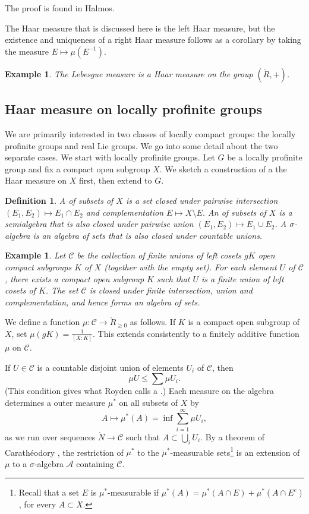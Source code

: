 \documentclass{amsart}
\newtheorem{definition}[equation]{Definition}
\newtheorem{example}[exercise]{Example}
\def\cC{{\mathcal C}}
\begin{document}
The proof is found in Halmos.

The Haar measure that is discussed here is the left Haar measure, but
the existence and uniqueness of a right Haar measure follows as a
corollary by taking the measure $E\mapsto \mu(E^{-1})$.

\begin{example} The Lebesgue measure is a Haar measure on the group
  $(\ring{R},+)$.
\end{example}

\newpage

\subsection{Haar measure on locally profinite groups}

We are primarily interested in two classes of locally compact groups:
the locally profinite groups and real Lie groups.  We go into some
detail about the two separate cases.  We start with locally profinite
groups.  Let $G$ be a locally profinite group and fix a compact open
subgroup $X$.  We sketch a construction of a 
the Haar measure on $X$ first, then extend
to $G$.

\begin{definition}
  A  of subsets of $X$ is a set closed under
  pairwise intersection $(E_1,E_2)\mapsto E_1\cap E_2$ and
  complementation $E\mapsto X\setminus E$.  An  of
  subsets of $X$ is a semialgebra that is also closed under pairwise
  union $(E_1,E_2)\mapsto E_1\cup E_2$.  A {\it $\sigma$-algebra} is
  an algebra of sets that is also closed under countable unions.
\end{definition}

\begin{example} Let $\cC$ be the collection of finite unions of
  left cosets $gK$ open compact subgroups $K$ of $X$ (together with
  the empty set).  For each element $U$ of $\cC$, there exists a
  compact open subgroup $K$ such that $U$ is a finite union of left
  cosets of $K$.  The set $\cC$ is closed under finite
  intersection, union and complementation, and hence forms an algebra
  of sets.
\end{example}

We define a function $\mu:\cC \to \ring{R}_{\ge0}$ as follows.
If $K$ is a compact open subgroup of $X$,
set $\mu(g K) = \frac{1}{[X:K]}$.  This extends consistently to a
finitely additive function $\mu$ on $\cC$.

If $U\in \cC$ is a countable disjoint union of elements $U_i$ of
$\cC$, then
\[
\mu U \le \sum \mu U_i.
\]
(This condition gives what Royden \cite[p 260]{royden} 
calls a .)  Each measure on the algebra determines
a outer measure $\mu^*$ on all subsets of $X$ by
\[
A \mapsto \mu^*(A) = \inf \sum_{i=1}^\infty \mu U_i,
\]
as we run over sequences $\ring{N}\to \cC$ such that $A\subset
\bigcup_i U_i$.  By a theorem of Carath\'eodory \cite[p 257]{royden},
the restriction of $\mu^*$ to the $\mu^*$-measurable
sets\footnote{Recall that a set $E$ is $\mu^*$-measurable if $\mu^*(A)
  = \mu^*(A\cap E) + \mu^*(A\cap E^c)$, for every $A\subset X$.} is an
extension of $\mu$ to a $\sigma$-algebra ${\mathcal A}$ containing $\cC$.
\end{document}

